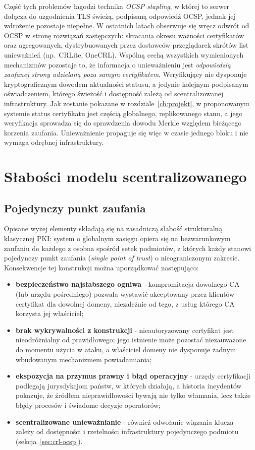Część tych problemów łagodzi technika \emph{OCSP stapling}, w której to serwer dołącza do uzgodnienia TLS świeżą, podpisaną odpowiedź OCSP, jednak jej wdrożenie pozostaje niepełne. W ostatnich latach obserwuje się wręcz odwrót od OCSP w stronę rozwiązań zastępczych: skracania okresu ważności certyfikatów oraz agregowanych, dystrybuowanych przez dostawców przeglądarek skrótów list unieważnień (np.\ CRLite, OneCRL). Wspólną cechą wszystkich wymienionych mechanizmów pozostaje to, że informacja o unieważnieniu jest \emph{odpowiedzią zaufanej strony udzielaną poza samym certyfikatem}. Weryfikujący nie dysponuje kryptograficznym dowodem aktualności statusu, a jedynie kolejnym podpisanym oświadczeniem, którego świeżość i dostępność zależą od scentralizowanej infrastruktury. Jak zostanie pokazane w rozdziale~\ref{ch:projekt}, w proponowanym systemie status certyfikatu jest częścią globalnego, replikowanego stanu, a jego weryfikacja sprowadza się do sprawdzenia dowodu Merkle względem bieżącego korzenia zaufania. Unieważnienie propaguje się więc w czasie jednego bloku i nie wymaga odrębnej infrastruktury.

\section{Słabości modelu scentralizowanego}
\label{sec:slabosci-pki}

\subsection{Pojedynczy punkt zaufania}
\label{subsec:spof}

Opisane wyżej elementy składają się na zasadniczą słabość strukturalną klasycznej PKI: system o globalnym zasięgu opiera się na bezwarunkowym zaufaniu do każdego z osobna spośród setek podmiotów, z których każdy stanowi pojedynczy punkt zaufania (\emph{single point of trust}) o nieograniczonym zakresie. Konsekwencje tej konstrukcji można uporządkować następująco:
\begin{itemize}
    \item \textbf{bezpieczeństwo najsłabszego ogniwa} - kompromitacja dowolnego CA (lub urzędu pośredniego) pozwala wystawić akceptowany przez klientów certyfikat dla dowolnej domeny, niezależnie od tego, z usług którego CA korzysta jej właściciel;
    \item \textbf{brak wykrywalności z konstrukcji} - nieautoryzowany certyfikat jest nieodróżnialny od prawidłowego; jego istnienie może pozostać niezauważone do momentu użycia w ataku, a właściciel domeny nie dysponuje żadnym wbudowanym mechanizmem powiadamiania;
    \item \textbf{ekspozycja na przymus prawny i błąd operacyjny} - urzędy certyfikacji podlegają jurysdykcjom państw, w których działają, a historia incydentów pokazuje, że źródłem nieprawidłowości bywają nie tylko włamania, lecz także błędy procesów i świadome decyzje operatorów;
    \item \textbf{scentralizowane unieważnianie} - również odwołanie wiązania klucza zależy od dostępności i rzetelności infrastruktury pojedynczego podmiotu (sekcja~\ref{sec:crl-ocsp}).
\end{itemize}

